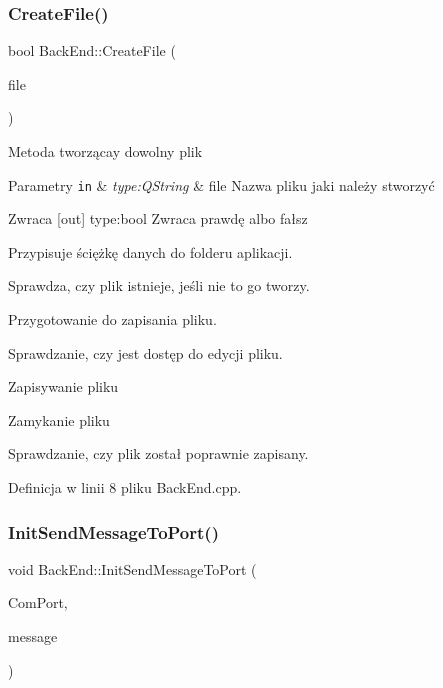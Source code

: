\subsubsection{\texorpdfstring{Create\+File()}{CreateFile()}}
{\footnotesize\ttfamily bool Back\+End\+::\+Create\+File (\begin{DoxyParamCaption}\item[{Q\+String}]{file }\end{DoxyParamCaption})}

Metoda tworzącay dowolny plik 
\begin{DoxyParams}[1]{Parametry}
\mbox{\tt in}  & {\em type\+:\+Q\+String} & file Nazwa pliku jaki należy stworzyć \\
\hline
\end{DoxyParams}
\begin{DoxyReturn}{Zwraca}
\mbox{[}out\mbox{]} type\+:bool Zwraca prawdę albo fałsz 
\end{DoxyReturn}
Przypisuje ściężkę danych do folderu aplikacji.

Sprawdza, czy plik istnieje, jeśli nie to go tworzy.

Przygotowanie do zapisania pliku.

Sprawdzanie, czy jest dostęp do edycji pliku.

Zapisywanie pliku

Zamykanie pliku

Sprawdzanie, czy plik został poprawnie zapisany. 

Definicja w linii 8 pliku Back\+End.\+cpp.

\mbox{\label{class_back_end_space_1_1_back_end_a1eb19f81437255ea4bf5cc1651f1047c}} 
\subsubsection{\texorpdfstring{Init\+Send\+Message\+To\+Port()}{InitSendMessageToPort()}}
{\footnotesize\ttfamily void Back\+End\+::\+Init\+Send\+Message\+To\+Port (\begin{DoxyParamCaption}\item[{Q\+String}]{Com\+Port,  }\item[{Q\+String}]{message }\end{DoxyParamCaption})}


